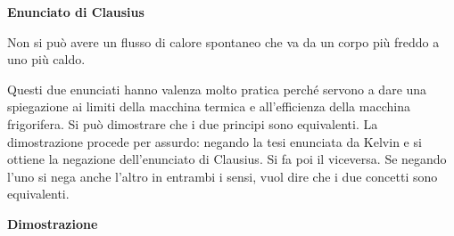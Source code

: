 \documentclass[10pt,a4paper]{book}
\begin{document}
\textbf{Enunciato di Clausius}

\noindent{}

Non si può avere un flusso di calore spontaneo che va da un corpo più freddo a uno più caldo.

Questi due enunciati hanno valenza molto pratica perché servono a dare una spiegazione ai limiti della macchina termica e all'efficienza della macchina frigorifera. Si può dimostrare che i due principi sono equivalenti. La dimostrazione procede per assurdo: negando la tesi enunciata da Kelvin e si ottiene la negazione dell'enunciato di Clausius. Si fa poi il viceversa. Se negando l'uno si nega anche l'altro in entrambi i sensi, vuol dire che i due concetti sono equivalenti.

\textbf{Dimostrazione}
\\
\end{document}
